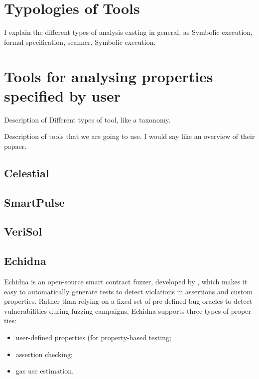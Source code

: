 \section{Typologies of Tools}
\label{sec:Tools:Typologies}
I explain the different types of analysis exsting in general, as Symbolic execution, formal specification, scanner, Symbolic execution.

\section{Tools for analysing properties specified by user}
\label{sec:Tools:Specification}
Description of Different types of tool, like a taxonomy.

Description of tools that we are going to use. 
I would say like an overview of their papaer.

\subsection{Celestial}
\label{sec:Specification:Celestial}


\subsection{SmartPulse}
\label{sec:Specification:SmartPulse}

\subsection{VeriSol}
\label{sec:Specification:VeriSol}


\subsection{Echidna}
\label{sec:Specification:Echidna}
Echidna is an open-source smart contract fuzzer, developed by \citet{Echidna}, which makes it easy to automatically generate tests to detect violations in
assertions and custom properties.
Rather than relying on a fixed set of pre-defined bug oracles to detect vulnerabilities
during fuzzing campaigns, Echidna supports three types of proper-
ties: 
\begin{itemize}
    \item user-defined properties (for property-based testing;
    \item assertion checking;
    \item gas use estimation.
\end{itemize}

